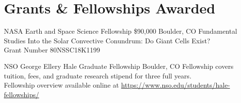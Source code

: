 \section{Grants \& Fellowships Awarded}

		{NASA Earth and Space Science Fellowship}
		{\$90,000}
		{Boulder, CO}
		{}
		{Fundamental Studies Into the Solar Convective Conundrum: Do Giant Cells Exist?\\
		 Grant Number 80NSSC18K1199}

		{NSO George Ellery Hale Graduate Fellowship}
		{}
		{Boulder, CO}
		{}
		{Fellowship covers tuition, fees, and graduate research stipend for three full years.\\
		 Fellowship overview available online at \href{https://www.nso.edu/students/hale-fellowships/}{https://www.nso.edu/students/hale-fellowships/}}
